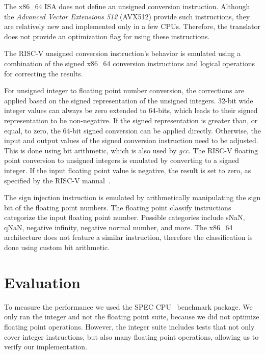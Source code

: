 \documentclass[course=eragp]{aspdoc}
\begin{document}
The x86\_64 ISA does not define an unsigned conversion instruction. Although the \textit{Advanced
    Vector Extensions 512} (AVX512) provide such instructions, they are relatively new and implemented
only in a few CPUs. Therefore, the translator does not provide an optimization flag for using these
instructions.

\par

The RISC-V unsigned conversion instruction's behavior is emulated using a combination of the
signed x86\_64 conversion instructions and logical operations for correcting the results.

\par

For unsigned integer to floating point number conversion, the corrections are applied based on the
signed representation of the unsigned integers. 32-bit wide integer values can always be zero
extended to 64-bits, which leads to their signed representation to be non-negative. If the signed
representation is greater than, or equal, to zero, the 64-bit signed conversion can be applied
directly. Otherwise, the input and output values of the signed conversion instruction need to be
adjusted. This is done using bit arithmetic, which is also used by \textit{gcc}. The RISC-V
floating point conversion to unsigned integers is emulated by converting to a signed integer. If the input floating
point value is negative, the result is set to zero, as specified by the RISC-V manual~\cite{rvspec}.


\par
The sign injection instruction is emulated by arithmetically manipulating the sign bit of the
floating point numbers. The floating point classify instructions categorize the input floating point
number. Possible categories include sNaN, qNaN, negative infinity, negative normal number, and more.
The x86\_64 architecture does not feature a similar instruction, therefore the classification is
done using custom bit arithmetic.

\section{Evaluation}\label{sec:evaluation}

To measure the performance we used the SPEC CPU~\cite{spec_cpu_2017} benchmark package.
We only ran the integer and not the floating point suite, because we did not optimize floating point operations.
However, the integer suite includes tests that not only cover integer instructions,
but also many floating point operations, allowing us to verify our implementation.
\end{document}
